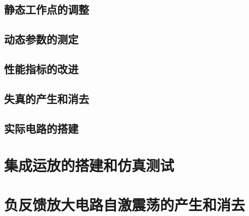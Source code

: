 \documentclass[UTF8,a4paper]{ctexart}
\begin{document}
\subsection{静态工作点的调整}
\subsection{动态参数的测定}
\subsection{性能指标的改进}
\subsection{失真的产生和消去}
\subsection{实际电路的搭建}
\section{集成运放的搭建和仿真测试}
\section{负反馈放大电路自激震荡的产生和消去}
\end{document}

